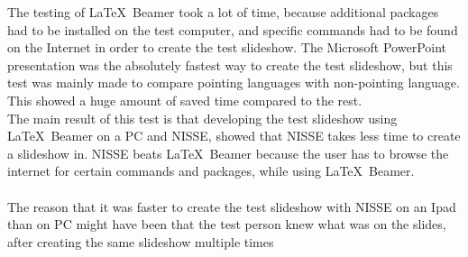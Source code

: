 The testing of \LaTeX~Beamer took a lot of time, because additional packages had to be installed on the test computer, and specific commands had to be found on the Internet in order to create the test slideshow.
The Microsoft PowerPoint presentation was the absolutely fastest way to create the test slideshow, but this test was mainly made to compare pointing languages with non-pointing language. This showed a huge amount of saved time compared to the rest. \\
The main result of this test is that developing the test slideshow using \LaTeX~Beamer on a PC and NISSE, showed that NISSE takes less time to create a slideshow in. NISSE beats \LaTeX~Beamer because the user has to browse the internet for certain commands and packages, while using \LaTeX~Beamer.
\\ \\
The reason that it was faster to create the test slideshow with NISSE on an Ipad than on PC might have been that the test person knew what was on the slides, after creating the same slideshow multiple times